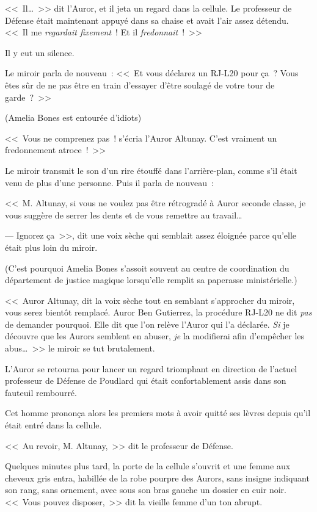 <<~Il…~>> dit l'Auror, et il jeta un regard dans la cellule. Le professeur de Défense était maintenant appuyé dans sa chaise et avait l'air assez détendu. <<~Il me \emph{regardait fixement}~! Et il \emph{fredonnait}~!~>>

Il y eut un silence.

Le miroir parla de nouveau~: <<~Et vous déclarez un RJ-L20 pour ça~? Vous êtes sûr de ne pas être en train d'essayer d'être soulagé de votre tour de garde~?~>>

(Amelia Bones est entourée d'idiots)

<<~Vous ne comprenez pas~! s'écria l'Auror Altunay. C'est vraiment un fredonnement atroce~!~>>

Le miroir transmit le son d'un rire étouffé dans l'arrière-plan, comme s'il était venu de plus d'une personne. Puis il parla de nouveau~:

<<~M. Altunay, si vous ne voulez pas être rétrogradé à Auror seconde classe, je vous suggère de serrer les dents et de vous remettre au travail…

--- Ignorez ça~>>, dit une voix sèche qui semblait assez éloignée parce qu'elle était plus loin du miroir.

(C'est pourquoi Amelia Bones s'assoit souvent au centre de coordination du département de justice magique lorsqu'elle remplit sa paperasse ministérielle.)

<<~Auror Altunay, dit la voix sèche tout en semblant s'approcher du miroir, vous serez bientôt remplacé. Auror Ben Gutierrez, la procédure RJ-L20 ne dit \emph{pas} de demander pourquoi. Elle dit que l'on relève l'Auror qui l'a déclarée. \emph{Si} je découvre que les Aurors semblent en abuser, \emph{je} la modifierai afin d'empêcher les abus…~>> le miroir se tut brutalement.

L'Auror se retourna pour lancer un regard triomphant en direction de l'actuel professeur de Défense de Poudlard qui était confortablement assis dans son fauteuil rembourré.

Cet homme prononça alors les premiers mots à avoir quitté ses lèvres depuis qu'il était entré dans la cellule.

<<~Au revoir, M. Altunay,~>> dit le professeur de Défense.

Quelques minutes plus tard, la porte de la cellule s'ouvrit et une femme aux cheveux gris entra, habillée de la robe pourpre des Aurors, sans insigne indiquant son rang, sans ornement, avec sous son bras gauche un dossier en cuir noir. <<~Vous pouvez disposer,~>> dit la vieille femme d'un ton abrupt.

